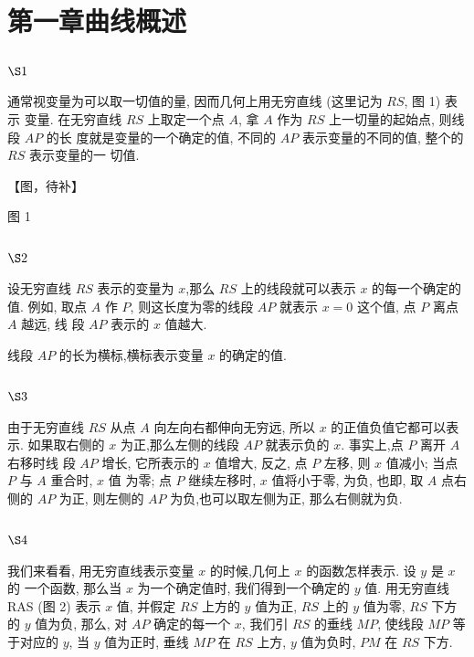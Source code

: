 \chapter{第一章曲线概述}
\section{$\S 1$}

通常视变量为可以取一切值的量, 因而几何上用无穷直线 (这里记为 $R S$, 图 1) 表示 变量. 在无穷直线 $R S$ 上取定一个点 $A$, 拿 $A$ 作为 $R S$ 上一切量的起始点, 则线段 $A P$ 的长 度就是变量的一个确定的值, 不同的 $A P$ 表示变量的不同的值, 整个的 $R S$ 表示变量的一 切值.


【图，待补】

图 1

\section{$\S 2$}

设无穷直线 $R S$ 表示的变量为 $x$,那么 $R S$ 上的线段就可以表示 $x$ 的每一个确定的 值. 例如, 取点 $A$ 作 $P$, 则这长度为零的线段 $A P$ 就表示 $x=0$ 这个值, 点 $P$ 离点 $A$ 越远, 线 段 $A P$ 表示的 $x$ 值越大.

线段 $A P$ 的长为横标,横标表示变量 $x$ 的确定的值.

\section{$\S 3$}

由于无穷直线 $R S$ 从点 $A$ 向左向右都伸向无穷远, 所以 $x$ 的正值负值它都可以表示. 如果取右侧的 $x$ 为正,那么左侧的线段 $A P$ 就表示负的 $x$. 事实上,点 $P$ 离开 $A$ 右移时线 段 $A P$ 增长, 它所表示的 $x$ 值增大, 反之, 点 $P$ 左移, 则 $x$ 值减小; 当点 $P$ 与 $A$ 重合时, $x$ 值 为零; 点 $P$ 继续左移时, $x$ 值将小于零, 为负, 也即, 取 $A$ 点右侧的 $A P$ 为正, 则左侧的 $A P$ 为负,也可以取左侧为正, 那么右侧就为负.

\section{$\S 4$}

我们来看看, 用无穷直线表示变量 $x$ 的时候,几何上 $x$ 的函数怎样表示. 设 $y$ 是 $x$ 的 一个函数, 那么当 $x$ 为一个确定值时, 我们得到一个确定的 $y$ 值. 用无穷直线 RAS (图 2) 表示 $x$ 值, 并假定 $R S$ 上方的 $y$ 值为正, $R S$ 上的 $y$ 值为零, $R S$ 下方的 $y$ 值为负, 那么, 对 $A P$ 确定的每一个 $x$, 我们引 $R S$ 的垂线 $M P$, 使线段 $M P$ 等于对应的 $y$, 当 $y$ 值为正时, 垂线 $M P$ 在 $R S$ 上方, $y$ 值为负时, $P M$ 在 $R S$ 下方.


